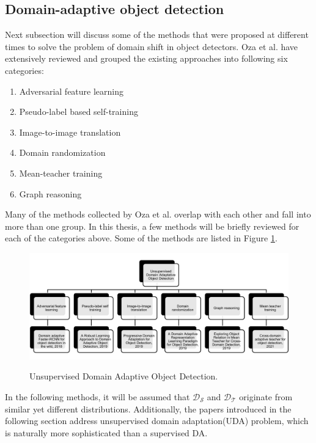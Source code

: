 \subsection{Domain-adaptive object detection}
\label{DAobj} 
Next subsection will discuss some of the methods that were proposed at different times to solve the problem of domain shift in object detectors. Oza et al.  \cite{Oza2021} have extensively reviewed and grouped the existing approaches into following six categories:
\begin{enumerate}
	\item Adversarial feature learning
	\item Pseudo-label based self-training
	\item Image-to-image translation
	\item Domain randomization 
	\item Mean-teacher training
	\item Graph reasoning
\end{enumerate} 

Many of the methods collected by Oza et al. overlap with each other and fall into more than one group. In this thesis, a few methods will be briefly reviewed for each of the categories above. Some of the methods are listed in Figure \ref{UDA_OD}.

\begin{figure}[htb]
	\begin{center}
		\includegraphics[width=16cm]{./UDA_OD.png}
	\end{center}
	\caption{Unsupervised Domain Adaptive Object Detection.}
	\begin{center}
		\label{UDA_OD}
	\end{center}
\end{figure}

In the following methods, it will be assumed that $\mathcal{D_S}$ and $\mathcal{D_T}$ originate from similar yet different distributions. Additionally, the papers introduced in the following section address unsupervised domain adaptation(UDA) problem, which is naturally more sophisticated than a supervised DA.
\FloatBarrier

